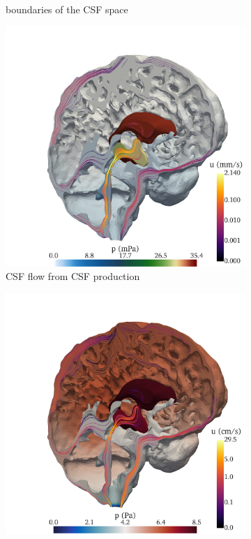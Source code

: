 \documentclass[fleqn,10pt]{wlscirep}
\begin{document}
\begin{figure}[h!]
\begin{subfigure}[b]{0.33\textwidth}
\caption{boundaries of the CSF space}
\label{fig:csf_flow_boundaries}
\end{subfigure}
\begin{subfigure}[b]{0.33\textwidth}
\includegraphics[width = 1 \textwidth]{figures/csf_v.png}
\caption{CSF flow from CSF production}
\label{fig:csf_flow_prod}
\end{subfigure}
\begin{subfigure}[b]{0.33\textwidth}
\includegraphics[width = 1 \textwidth]{figures/cardiac_csf_v.png}

\end{subfigure}
\end{figure}
\end{document}
